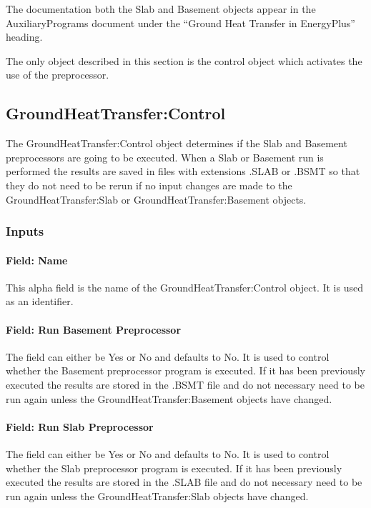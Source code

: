 The documentation both the Slab and Basement objects appear in the AuxiliaryPrograms document under the ``Ground Heat Transfer in EnergyPlus'' heading.

The only object described in this section is the control object which activates the use of the preprocessor.

\subsection{GroundHeatTransfer:Control}\label{groundheattransfercontrol}

The GroundHeatTransfer:Control object determines if the Slab and Basement preprocessors are going to be executed. When a Slab or Basement run is performed the results are saved in files with extensions .SLAB or .BSMT so that they do not need to be rerun if no input changes are made to the GroundHeatTransfer:Slab or GroundHeatTransfer:Basement objects.

\subsubsection{Inputs}\label{inputs-013}

\paragraph{Field: Name}\label{field-name-012}

This alpha field is the name of the GroundHeatTransfer:Control object. It is used as an identifier.

\paragraph{Field: Run Basement Preprocessor}\label{field-run-basement-preprocessor}

The field can either be Yes or No and defaults to No. It is used to control whether the Basement preprocessor program is executed. If it has been previously executed the results are stored in the .BSMT file and do not necessary need to be run again unless the GroundHeatTransfer:Basement objects have changed.

\paragraph{Field: Run Slab Preprocessor}\label{field-run-slab-preprocessor}

The field can either be Yes or No and defaults to No. It is used to control whether the Slab preprocessor program is executed. If it has been previously executed the results are stored in the .SLAB file and do not necessary need to be run again unless the GroundHeatTransfer:Slab objects have changed.